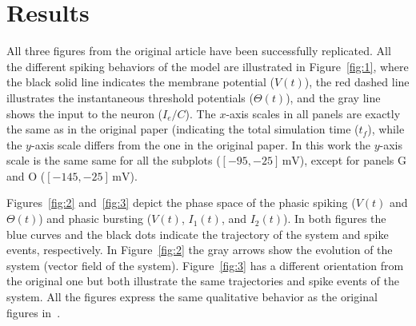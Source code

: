 \documentclass[10pt,a4paper,onecolumn]{article}
\newcommand{\Rm}[1]{\mathrm{#1}}
\begin{document}
\clearpage

\section{Results}\label{results}

All three figures from the original article have been successfully replicated.
All the different spiking behaviors of the model are illustrated in 
Figure~\ref{fig:1}, where the black solid line indicates the membrane potential
($V(t)$), the red dashed line illustrates the instantaneous threshold potentials
($\Theta(t)$), and the gray line shows the input to the neuron ($I_e/C$). 
The $x$-axis scales in all panels are exactly the same as in the original
paper (indicating the total simulation time ($t_f$), while the $y$-axis scale 
differs from the one in the original paper. In this work the $y$-axis scale
is the same same for all the subplots ($[-95, -25]\, \Rm{mV}$), except for
panels G and O ($[-145, -25]\, \Rm{mV}$).

Figures~\ref{fig:2} and~\ref{fig:3} depict the phase space of the phasic
spiking ($V(t)$ and $\Theta(t)$) and phasic bursting ($V(t)$,
$I_1(t)$, and $I_2(t)$). In both figures the blue curves and the black dots 
indicate the trajectory of the system and spike events, respectively.
In Figure~\ref{fig:2} the gray arrows show the evolution of the system
(vector field of the system). Figure~\ref{fig:3} has a different orientation 
from the original one but both illustrate the same trajectories and spike 
events of the system. 
All the figures express the same qualitative behavior as the original
figures in~\cite{mihalas:2009}.
\end{document}
